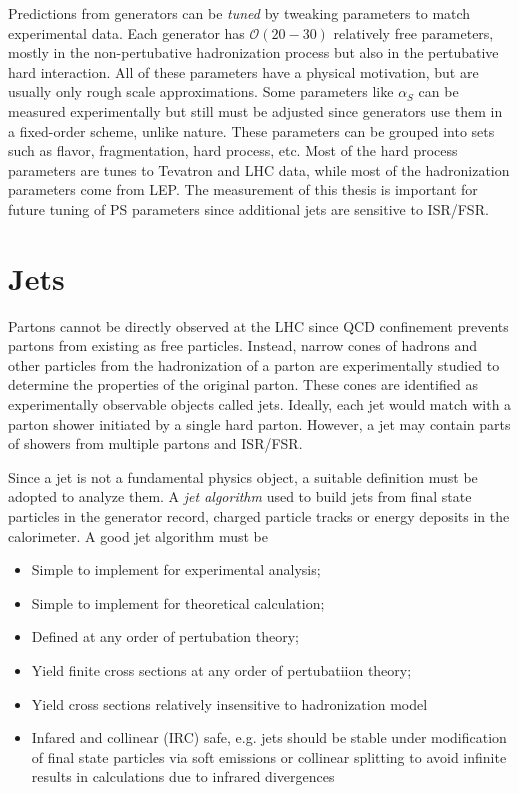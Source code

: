 Predictions from generators can be \emph{tuned} by tweaking parameters to match experimental data\cite{Buckley:2009vk}. Each generator has $\mathcal{O}(20-30)$ relatively free parameters, mostly in the non-pertubative hadronization process but also in the pertubative hard interaction. All of these parameters have a physical motivation, but are usually only rough scale approximations. Some parameters like $\alpha_S$ can be measured experimentally but still must be adjusted since generators use them in a fixed-order scheme, unlike nature. These parameters can be grouped into sets such as flavor, fragmentation, hard process, etc. Most of the hard process parameters are tunes to Tevatron and LHC data, while most of the hadronization parameters come from LEP. The measurement of this thesis is important for future tuning of PS parameters since additional jets are sensitive to ISR/FSR.

\section{Jets}
Partons cannot be directly observed at the LHC since QCD confinement prevents partons from existing as free particles. Instead, narrow cones of hadrons and other particles from the hadronization of a parton are experimentally studied to determine the properties of the original parton. These cones are identified as experimentally observable objects called jets. Ideally, each jet would match with a parton shower initiated by a single hard parton. However, a jet may contain parts of showers from multiple partons and ISR/FSR. 

Since a jet is not a fundamental physics object, a suitable definition must be adopted to analyze them. A \emph{jet algorithm} used to build jets from final state particles in the generator record, charged particle tracks or energy deposits in the calorimeter. A good jet algorithm must be~\cite{Atkin:2015msa}
\begin{itemize}
\item Simple to implement for experimental analysis;
\item Simple to implement for theoretical calculation;
\item Defined at any order of pertubation theory;
\item Yield finite cross sections at any order of pertubatiion theory;
\item Yield cross sections relatively insensitive to hadronization model
\item Infared and collinear (IRC) safe, e.g. jets should be stable under modification of final state particles via soft emissions or collinear splitting to avoid infinite results in calculations due to infrared divergences
\end{itemize}

